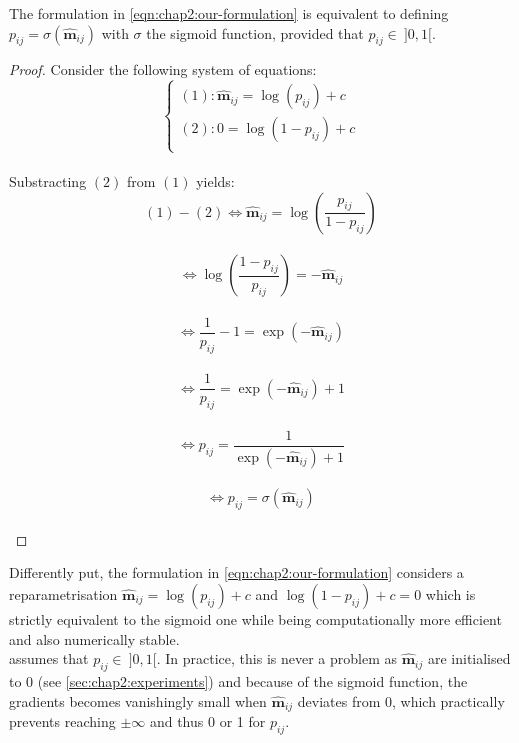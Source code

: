 \begin{proposition}
  \label{prop:chap2:probability-interpretation}
  The formulation in \cref{eqn:chap2:our-formulation} is equivalent to defining
  $p_{ij} = \sigma(\bm{\hat{m}}_{ij})$ with $\sigma$ the sigmoid function,
  provided that $p_{ij}\in ~ ]0,1[$.
\end{proposition}
\vspace*{\baselineskip}

\begin{proof}
  Consider the following system of equations:\\
  $$
  \left\{ 
    \begin{array}{l}
      (1): \bm{\hat{m}}_{ij} = \log(p_{ij})+c\\ 
      (2): 0 = \log(1-p_{ij})+c\\
    \end{array} 
    \right.
  $$\\
  Substracting $(2)$ from $(1)$ yields:\\
  $$ (1) - (2) \Leftrightarrow \bm{\hat{m}}_{ij} = \displaystyle\log\left( \frac{p_{ij}}{1 - p_{ij}} \right)$$\\
  $$ \Leftrightarrow \log\left(\frac{1-p_{ij}}{p_{ij}} \right) = -
  \bm{\hat{m}}_{ij}$$\\
  $$ \Leftrightarrow \frac{1}{p_{ij}} - 1 = \exp(-\bm{\hat{m}}_{ij})$$\\
  $$ \Leftrightarrow \frac{1}{p_{ij}} = \exp(-\bm{\hat{m}}_{ij}) + 1$$\\
  $$ \Leftrightarrow p_{ij} = \frac{1}{\exp(-\bm{\hat{m}}_{ij}) + 1}$$\\
  $$ \Leftrightarrow p_{ij} = \sigma(\bm{\hat{m}}_{ij})$$\\

\end{proof}


Differently put, the formulation in \cref{eqn:chap2:our-formulation} considers a
reparametrisation $\bm{\hat{m}}_{ij} = \log(p_{ij})+c$ and $\log(1-p_{ij})+ c =0$ which is strictly
equivalent to the sigmoid one while being computationally more efficient and
also numerically stable.\\

 assumes that $p_{ij}\in ~ ]0,1[$.
In practice, this is never a problem as $\bm{\hat{m}}_{ij}$ are initialised to 0
(see \cref{sec:chap2:experiments}) and because of the sigmoid function, the
gradients becomes vanishingly small when $\bm{\hat{m}}_{ij}$ deviates from 0,
which practically prevents reaching $\pm\infty$ and thus 0 or 1 for $p_{ij}$.\\

